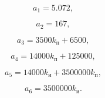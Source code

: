 \begin{equation}
    a_1 = 5.072,
\end{equation}

\begin{equation}
    a_2 = 167,
\end{equation}

\begin{equation}
    a_3 = 3500k_{\text{п}}+6500,
\end{equation}

\begin{equation}
    a_4 = 14000k_{\text{п}}+125000,
\end{equation}

\begin{equation}
    a_5 = 14000k_{\text{и}}+3500000k_{\text{п}},
\end{equation}

\begin{equation}
    a_6 = 3500000k_{\text{и}}.
\end{equation}
